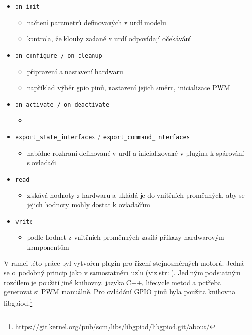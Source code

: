 \newpage
\begin{itemize}[leftmargin=*]
	\item{\verb|on_init|}
	\vspace*{-0.5em}
	\begin{itemize}
		\item{načtení parametrů definovaných v urdf modelu}
		\item{kontrola, že klouby zadané v urdf odpovídají očekávání}
	\end{itemize}
	\item{\verb|on_configure / on_cleanup|}
	\vspace*{-0.5em}
	\begin{itemize}
		\item{připravení a nastavení hardwaru}
		\item{například výběr gpio pinů, nastavení jejich směru, inicializace PWM}
	\end{itemize}
	\item{\verb|on_activate / on_deactivate|}
	\vspace*{-0.5em}
	\begin{itemize}
		\item{}
	\end{itemize}
	\item{\verb|export_state_interfaces| / \verb|export_command_interfaces|}
	\vspace*{-0.5em}
	\begin{itemize}
		\item{nabídne rozhraní definované v urdf a inicializované v pluginu k spárování s ovladači}
	\end{itemize}
	\item{\verb|read|}
	\vspace*{-0.5em}
	\begin{itemize}
		\item{získává hodnoty z hardwaru a ukládá je do vnitřních proměnných, aby se jejich hodnoty mohly dostat k ovladačům}
	\end{itemize}
	\item{\verb|write|}
	\vspace*{-0.5em}
	\begin{itemize}
		\item{podle hodnot z vnitřních proměnných zasílá příkazy hardwarovým komponentům}
	\end{itemize}
\end{itemize}

V rámci této práce byl vytvořen plugin pro řízení stejnosměrných motorů. Jedná se o~podobný princip jako v samostatném uzlu (viz str: \pageref{implementation:motors}). Jediným podstatným rozdílem je použití jiné knihovny, jazyka C++, lifecycle metod a potřeba generovat si PWM manuálně. Pro ovládání GPIO pinů byla použita knihovna libgpiod.\footnote{\url{https://git.kernel.org/pub/scm/libs/libgpiod/libgpiod.git/about/}}

